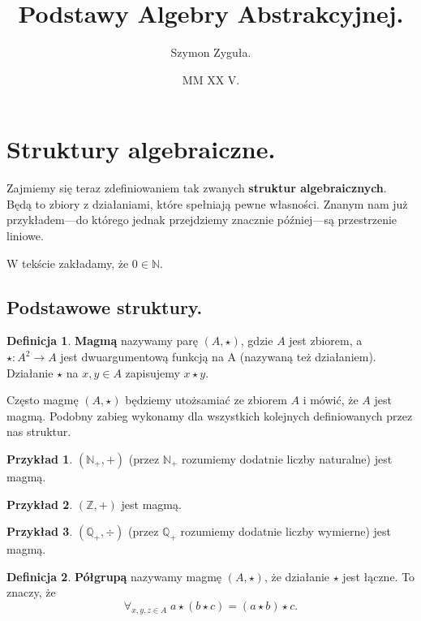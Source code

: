\documentclass{article}
\date{MM XX V.}
\author{Szymon Zyguła.}
\title{Podstawy Algebry Abstrakcyjnej.}
\theoremstyle{definition}
\newtheorem{definition}{Definicja}[section]
\newtheorem{example}{Przykład}[section]
\begin{document}
\maketitle

\section{Struktury algebraiczne.}

Zajmiemy się teraz zdefiniowaniem tak zwanych \textbf{struktur algebraicznych}.
Będą to zbiory z działaniami, które spełniają pewne własności.
Znanym nam już przykładem---do którego jednak przejdziemy znacznie później---są przestrzenie liniowe.

W tekście zakładamy, że $0 \in \mathbb{N}$.

\subsection{Podstawowe struktury.}

\begin{definition}
	\textbf{Magmą} nazywamy parę $(A, \star)$, gdzie $A$ jest zbiorem, a $\star: A^2 \to A$ jest dwuargumentową funkcją na A (nazywaną też działaniem). Działanie $\star$ na $x, y \in A$ zapisujemy $x \star y$.
\end{definition}
Często magmę $(A, \star)$ będziemy utożsamiać ze zbiorem $A$ i mówić, że $A$ jest magmą.
Podobny zabieg wykonamy dla wszystkich kolejnych definiowanych przez nas struktur.

\begin{example}
	$(\mathbb{N}_+, +)$ (przez $\mathbb{N}_+$ rozumiemy dodatnie liczby naturalne) jest magmą.
\end{example}

\begin{example}
	$(\mathbb{Z}, +)$ jest magmą.
\end{example}

\begin{example}
	$(\mathbb{Q}_+, \div)$ (przez $\mathbb{Q}_+$ rozumiemy dodatnie liczby wymierne) jest magmą.
\end{example}

\begin{definition}
	\textbf{Półgrupą} nazywamy magmę $(A, \star)$, że działanie $\star$ jest łączne. To znaczy, że
	\begin{equation*}
		\forall_{x,y,z \in A}\; a \star (b \star c) = (a \star b) \star c.
	\end{equation*}
\end{definition}
\end{document}

